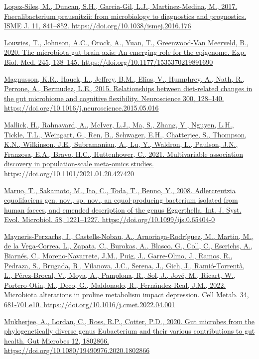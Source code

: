 \documentclass[
]{article}
\begin{document}
\href{https://www.zotero.org/google-docs/?uydJ8e}{Lopez-Siles, M.,
Duncan, S.H., Garcia-Gil, L.J., Martinez-Medina, M., 2017.
Faecalibacterium prausnitzii: from microbiology to diagnostics and
prognostics. ISME J. 11, 841--852.
https://doi.org/10.1038/ismej.2016.176}

\href{https://www.zotero.org/google-docs/?uydJ8e}{Louwies, T., Johnson,
A.C., Orock, A., Yuan, T., Greenwood-Van Meerveld, B., 2020. The
microbiota-gut-brain axis: An emerging role for the epigenome. Exp.
Biol. Med. 245, 138--145. https://doi.org/10.1177/1535370219891690}

\href{https://www.zotero.org/google-docs/?uydJ8e}{Magnusson, K.R.,
Hauck, L., Jeffrey, B.M., Elias, V., Humphrey, A., Nath, R., Perrone,
A., Bermudez, L.E., 2015. Relationships between diet-related changes in
the gut microbiome and cognitive flexibility. Neuroscience 300,
128--140. https://doi.org/10.1016/j.neuroscience.2015.05.016}

\href{https://www.zotero.org/google-docs/?uydJ8e}{Mallick, H.,
Rahnavard, A., McIver, L.J., Ma, S., Zhang, Y., Nguyen, L.H., Tickle,
T.L., Weingart, G., Ren, B., Schwager, E.H., Chatterjee, S., Thompson,
K.N., Wilkinson, J.E., Subramanian, A., Lu, Y., Waldron, L., Paulson,
J.N., Franzosa, E.A., Bravo, H.C., Huttenhower, C., 2021. Multivariable
association discovery in population-scale meta-omics studies.
https://doi.org/10.1101/2021.01.20.427420}

\href{https://www.zotero.org/google-docs/?uydJ8e}{Maruo, T., Sakamoto,
M., Ito, C., Toda, T., Benno, Y., 2008. Adlercreutzia equolifaciens gen.
nov., sp. nov., an equol-producing bacterium isolated from human faeces,
and emended description of the genus Eggerthella. Int. J. Syst. Evol.
Microbiol. 58, 1221--1227. https://doi.org/10.1099/ijs.0.65404-0}

\href{https://www.zotero.org/google-docs/?uydJ8e}{Mayneris-Perxachs, J.,
Castells-Nobau, A., Arnoriaga-Rodríguez, M., Martin, M., de la
Vega-Correa, L., Zapata, C., Burokas, A., Blasco, G., Coll, C.,
Escrichs, A., Biarnés, C., Moreno-Navarrete, J.M., Puig, J., Garre-Olmo,
J., Ramos, R., Pedraza, S., Brugada, R., Vilanova, J.C., Serena, J.,
Gich, J., Ramió-Torrentà, L., Pérez-Brocal, V., Moya, A., Pamplona, R.,
Sol, J., Jové, M., Ricart, W., Portero-Otin, M., Deco, G., Maldonado,
R., Fernández-Real, J.M., 2022. Microbiota alterations in proline
metabolism impact depression. Cell Metab. 34, 681-701.e10.
https://doi.org/10.1016/j.cmet.2022.04.001}

\href{https://www.zotero.org/google-docs/?uydJ8e}{Mukherjee, A., Lordan,
C., Ross, R.P., Cotter, P.D., 2020. Gut microbes from the
phylogenetically diverse genus Eubacterium and their various
contributions to gut health. Gut Microbes 12, 1802866.
https://doi.org/10.1080/19490976.2020.1802866}
\end{document}
